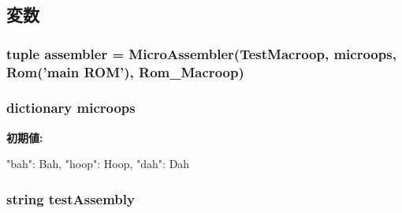 \subsection{変数}
\hypertarget{namespacemicro__asm__test_a74c95ea135aaf952aafb757531325188}{
\subsubsection[{assembler}]{\setlength{\rightskip}{0pt plus 5cm}tuple {\bf assembler} = {\bf MicroAssembler}({\bf TestMacroop}, {\bf microops}, Rom('main ROM'), Rom\_\-Macroop)}}
\label{namespacemicro__asm__test_a74c95ea135aaf952aafb757531325188}
\hypertarget{namespacemicro__asm__test_ab606ba888b0a7ffba69d1166a36fba58}{
\subsubsection[{microops}]{\setlength{\rightskip}{0pt plus 5cm}dictionary {\bf microops}}}
\label{namespacemicro__asm__test_ab606ba888b0a7ffba69d1166a36fba58}
{\bfseries 初期値:}
\begin{DoxyCode}
{
    "bah": Bah,
    "hoop": Hoop,
    "dah": Dah
}
\end{DoxyCode}
\hypertarget{namespacemicro__asm__test_a24df19f1ed186263dd123a909e9c55dc}{
\subsubsection[{testAssembly}]{\setlength{\rightskip}{0pt plus 5cm}string {\bf testAssembly}}}
\label{namespacemicro__asm__test_a24df19f1ed186263dd123a909e9c55dc}
